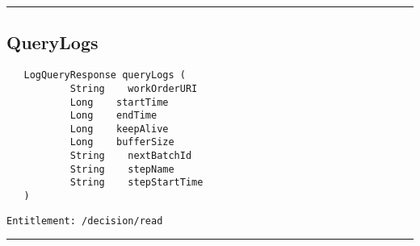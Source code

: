 \rule{12cm}{2pt}
\subsection{QueryLogs}
\label{Api:QueryLogs}
\begin{verbatim}
   LogQueryResponse queryLogs (
           String    workOrderURI
           Long    startTime
           Long    endTime
           Long    keepAlive
           Long    bufferSize
           String    nextBatchId
           String    stepName
           String    stepStartTime
   )
\end{verbatim}
\begin{Verbatim}[fontsize=\small, formatcom=\color{Maroon}]
  Entitlement: /decision/read
\end{Verbatim}



\rule{12cm}{2pt}
